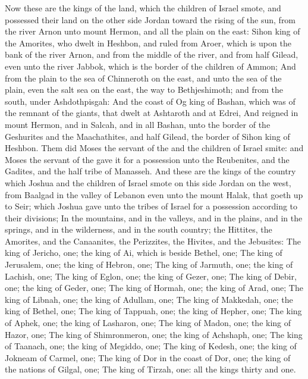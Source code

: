 \begin{biblechapter} %
 Now these are the kings of the land, which the children of Israel smote, and possessed their land on the other side Jordan toward the rising of the sun, from the river Arnon unto mount Hermon, and all the plain on the east:
\verse Sihon king of the Amorites, who dwelt in Heshbon, and ruled from Aroer, which is upon the bank of the river Arnon, and from the middle of the river, and from half Gilead, even unto the river Jabbok, which is the border of the children of Ammon;
\verse And from the plain to the sea of Chinneroth on the east, and unto the sea of the plain, even the salt sea on the east, the way to Bethjeshimoth; and from the south, under Ashdothpisgah:
\verse And the coast of Og king of Bashan, which was of the remnant of the giants, that dwelt at Ashtaroth and at Edrei,
\verse And reigned in mount Hermon, and in Salcah, and in all Bashan, unto the border of the Geshurites and the Maachathites, and half Gilead, the border of Sihon king of Heshbon.
\verse Them did Moses the servant of the \LORD and the children of Israel smite: and Moses the servant of the \LORD gave it for a possession unto the Reubenites, and the Gadites, and the half tribe of Manasseh.
\verse And these are the kings of the country which Joshua and the children of Israel smote on this side Jordan on the west, from Baalgad in the valley of Lebanon even unto the mount Halak, that goeth up to Seir; which Joshua gave unto the tribes of Israel for a possession according to their divisions;
\verse In the mountains, and in the valleys, and in the plains, and in the springs, and in the wilderness, and in the south country; the Hittites, the Amorites, and the Canaanites, the Perizzites, the Hivites, and the Jebusites:
\verse The king of Jericho, one; the king of Ai, which is beside Bethel, one;
\verse The king of Jerusalem, one; the king of Hebron, one;
\verse The king of Jarmuth, one; the king of Lachish, one;
\verse The king of Eglon, one; the king of Gezer, one;
\verse The king of Debir, one; the king of Geder, one;
\verse The king of Hormah, one; the king of Arad, one;
\verse The king of Libnah, one; the king of Adullam, one;
\verse The king of Makkedah, one; the king of Bethel, one;
\verse The king of Tappuah, one; the king of Hepher, one;
\verse The king of Aphek, one; the king of Lasharon, one;
\verse The king of Madon, one; the king of Hazor, one;
\verse The king of Shimronmeron, one; the king of Achshaph, one;
\verse The king of Taanach, one; the king of Megiddo, one;
\verse The king of Kedesh, one; the king of Jokneam of Carmel, one;
\verse The king of Dor in the coast of Dor, one; the king of the nations of Gilgal, one;
\verse The king of Tirzah, one: all the kings thirty and one.
\end{biblechapter}

